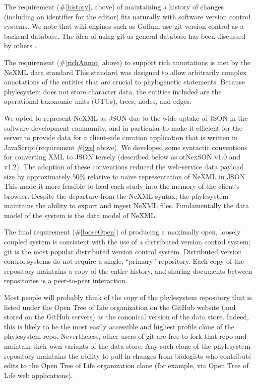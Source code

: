 \documentclass{bioinfo}
\newcommand{\ps}{phylesystem\xspace}
\newcommand{\otol}{Open Tree of Life\xspace}
\newcommand{\nexson}{otNexSON\xspace}
\newcommand{\js}{JavaScript\xspace}
\begin{document}
The requirement (\#\ref{history}, above) of maintaining a history of changes 
    (including an identifier for the editor) fits naturally with software version control systems.
We note that wiki engines such as Gollum use git version control as a backend database.
The idea of using git as general database has been discussed by others \citep{git-nosql-db}.

The requirement (\#\ref{richAnnot} above) to support rich annotations
    is met by the NeXML data standard 
    This standard was designed
    to allow arbitrarily complex annotations of the entities that are crucial to phylogenetic statements.
Because \ps does not store character data, the entities included are the operational taxonomic units (OTUs), trees, nodes, and edges.

We opted to represent NeXML as JSON
    due to the wide uptake of JSON in the software development community, and in particular 
    to make it efficient for the server to provide data for a client-side
    curation application that is written in \js (requirement \#\ref{ws} above).
We developed some syntactic conventions for converting XML to JSON tersely (described below as \nexson v1.0 and v1.2).
The adoption of these conventions reduced the web-service data payload size by approximately 50\% relative to 
    naive representation of NeXML in JSON.
This made it more feasible to load each study into the memory of the client's browser.
Despite the departure from the NeXML syntax, the \ps maintains the ability to export and ingest NeXML files.
Fundamentally the data model of the system is the data model of NeXML.

The final requirement (\#\ref{looseOpen}) of producing a maximally open,
    loosely coupled system is consistent with the use of a distributed
    version control system; git is the most popular distributed version control system.
Distributed version control systems do not require a single, ``primary'' repository.
Each copy of the repository maintains a copy of the entire history, and sharing documents between
    repositories is a peer-to-peer interaction.

Most people will probably think of the copy of the \ps repository that is listed under the \otol organization on
    the GitHub website (and stored on the GitHub servers) as the canonical version of the data store.
Indeed, this is likely to be the most easily accessible and highest profile clone of the \ps repo.
Nevertheless, other users of git are free to fork that repo and maintain their own variants of the data store.
Any such clone of the \ps repository maintains the ability to pull in changes from biologists who contribute
    edits to the \otol organization clone (for example, via \otol web applications).
\end{document}
